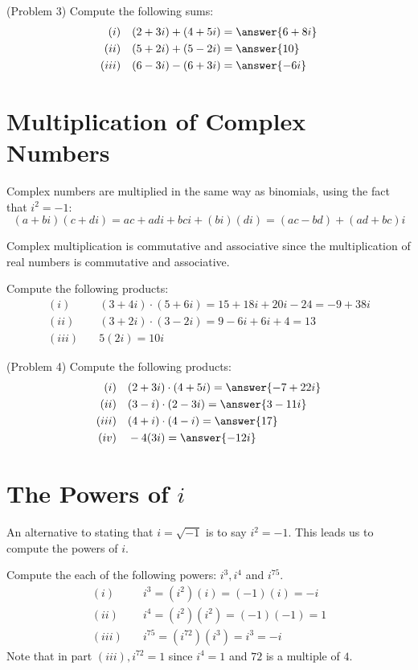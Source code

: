 \documentclass[handout]{ximera}
\begin{document}
\begin{problem}(Problem 3)
Compute the following sums:
\begin{align*}
(i)& \quad (2+3i) + (4+5i) = \answer{6+8i} \\
(ii)& \quad(5+2i) + (5-2i) = \answer{10}\\
(iii)& \quad(6-3i) - (6+3i) = \answer{-6i}
\end{align*}
\end{problem}

\section{Multiplication of Complex Numbers}
Complex numbers are multiplied in the same way as binomials, using the fact that $i^2 = -1$:
\[
(a+bi)(c+di) = ac + adi + bci + (bi)(di) = (ac-bd) + (ad+bc)i
\]

Complex multiplication is commutative and associative since the multiplication of real numbers is commutative and associative.

\begin{example}[Example 4]
Compute the following products:
\begin{align*}
(i)& \quad (3+4i) \cdot (5+6i) = 15 + 18i + 20i - 24 = -9 + 38i \\
(ii)& \quad (3+2i) \cdot (3-2i) = 9-6i+6i+4=13 \\
(iii)& \quad 5(2i) = 10i
\end{align*}

\end{example}


\begin{problem}(Problem 4)
Compute the following products:
\begin{align*}
(i)& \quad (2+3i) \cdot (4+5i) = \answer{-7+22i}\\
(ii)& \quad (3-i) \cdot (2-3i) = \answer{3-11i}\\
(iii)& \quad (4+i) \cdot (4-i) = \answer{17}\\
(iv)& \quad -4(3i)= \answer{-12i}
\end{align*}
\end{problem}


\section{The Powers of $i$}
An alternative to stating that $i = \sqrt {-1}$ is to say $i^2 = -1$. This leads us to compute the powers of $i$.

\begin{example}[Example 5]
Compute the each of the following powers: $i^3, i^4$ and $i^{75}$.
\begin{align*}
(i)& \quad i^3 = (i^2)(i) = (-1)(i) =-i\\
(ii)& \quad i^4 = (i^2)(i^2) = (-1)(-1) = 1\\
(iii)& \quad i^{75} = (i^{72})(i^3) = i^3 = -i
\end{align*}
Note that in part $(iii), i^{72} =1$ since $i^4 =1$ and $72$ is a multiple of $4$.
\end{example}
\end{document}
